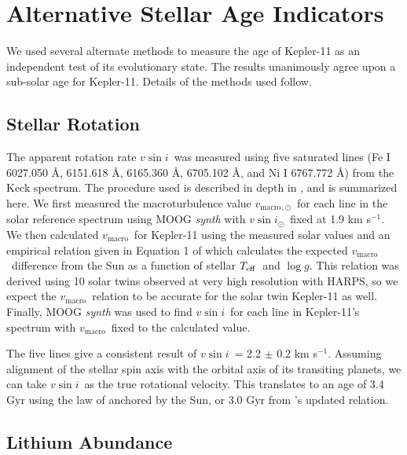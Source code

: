 \documentclass[twocolumn]{aastex61}
\newcommand{\teff}{$T_{\rm eff}$}
\newcommand{\logg}{$\log g$}
\newcommand{\vsini}{$v \sin{i}$}
\newcommand{\vmacro}{$v_{\mathrm{macro}}$}
\newcommand{\kms}{km s$^{-1}$}
\begin{document}
\section{Alternative Stellar Age Indicators}
\label{s:ages}

We used several alternate methods to measure the age of Kepler-11 as an independent test of its evolutionary state. The results unanimously agree upon a sub-solar age for Kepler-11. Details of the methods used follow.

\subsection{Stellar Rotation}

The apparent rotation rate \vsini\ was measured using five saturated lines (Fe I 6027.050 \r{A}, 6151.618 \r{A}, 6165.360 \r{A}, 6705.102 \r{A}, and Ni I 6767.772 \r{A}) from the Keck spectrum. The procedure used is described in depth in \citet{dosSantos2016}, and is summarized here. We first measured the macroturbulence value \vmacro$_{,\odot}$\ for each line in the solar reference spectrum using MOOG \textit{synth} with \vsini$_{\odot}$\ fixed at 1.9 \kms. We then calculated \vmacro\ for Kepler-11 using the measured solar values and an empirical relation given in Equation 1 of \citet{dosSantos2016} which calculates the expected \vmacro\ difference from the Sun as a function of stellar \teff\ and \logg. This relation was derived using 10 solar twins observed at very high resolution with HARPS, so we expect the \vmacro\ relation to be accurate for the solar twin Kepler-11 as well. Finally, MOOG \textit{synth} was used to find \vsini\ for each line in Kepler-11's spectrum with \vmacro\ fixed to the calculated value.

The five lines give a consistent result of \vsini\ = 2.2 $\pm$ 0.2 \kms. Assuming alignment of the stellar spin axis with the orbital axis of its transiting planets, we can take \vsini\ as the true rotational velocity. This translates to an age of 3.4 Gyr using the law of \citet{Skumanich1972} anchored by the Sun, or 3.0 Gyr from \citet{dosSantos2016}'s updated relation.

\subsection{Lithium Abundance}
\label{s:lithium}
\end{document}
